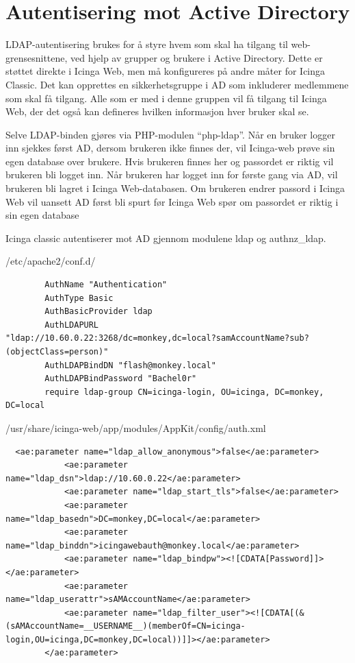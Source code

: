 \section{Autentisering mot Active Directory} 
LDAP-autentisering brukes for å styre hvem som skal ha tilgang til web-grensesnittene, ved hjelp av grupper og brukere i Active Directory. Dette er støttet direkte i Icinga Web, men må konfigureres på andre måter for Icinga Classic. Det kan opprettes en sikkerhetsgruppe i AD som inkluderer medlemmene som skal få tilgang. Alle som er med i denne gruppen vil få tilgang til Icinga Web, der det også kan defineres hvilken informasjon hver bruker skal se. 

Selve LDAP-binden gjøres via PHP-modulen “php-ldap”. Når en bruker logger inn sjekkes først AD, dersom brukeren ikke finnes der, vil Icinga-web prøve sin egen database over brukere. Hvis brukeren finnes her og passordet er riktig vil brukeren bli logget inn. Når brukeren har logget inn for første gang via AD, vil brukeren bli lagret i Icinga Web-databasen. Om brukeren endrer passord i Icinga Web vil uansett AD først bli spurt før Icinga Web spør om passordet er riktig i sin egen database

Icinga classic autentiserer mot AD gjennom modulene ldap og authnz\_ldap.

/etc/apache2/conf.d/
\begin{lstlisting}
        AuthName "Authentication"
        AuthType Basic
        AuthBasicProvider ldap
        AuthLDAPURL
"ldap://10.60.0.22:3268/dc=monkey,dc=local?samAccountName?sub?(objectClass=person)"
        AuthLDAPBindDN "flash@monkey.local"
        AuthLDAPBindPassword "Bachel0r"
        require ldap-group CN=icinga-login, OU=icinga, DC=monkey, DC=local
\end{lstlisting}

/usr/share/icinga-web/app/modules/AppKit/config/auth.xml
\begin{lstlisting}
  <ae:parameter name="ldap_allow_anonymous">false</ae:parameter>
            <ae:parameter name="ldap_dsn">ldap://10.60.0.22</ae:parameter>
            <ae:parameter name="ldap_start_tls">false</ae:parameter>
            <ae:parameter name="ldap_basedn">DC=monkey,DC=local</ae:parameter>
            <ae:parameter name="ldap_binddn">icingawebauth@monkey.local</ae:parameter>
            <ae:parameter name="ldap_bindpw"><![CDATA[Password]]></ae:parameter>
            <ae:parameter name="ldap_userattr">sAMAccountName</ae:parameter>
            <ae:parameter name="ldap_filter_user"><![CDATA[(&(sAMAccountName=__USERNAME__)(memberOf=CN=icinga-login,OU=icinga,DC=monkey,DC=local))]]></ae:parameter>
        </ae:parameter>
\end{lstlisting}

